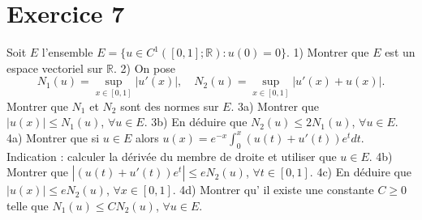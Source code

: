 \documentclass{article}
\begin{document}
\section*{Exercice 7}
Soit $E$ l'ensemble $E = \{ u \in C^1([0, 1]; \mathbb{R}) : u(0) = 0 \}$.
1) Montrer que $E$ est un espace vectoriel sur $\mathbb{R}$.
2) On pose
\[ N_1(u) = \sup_{x \in [0,1]} |u'(x)|, \quad N_2(u) = \sup_{x \in [0,1]} |u'(x) + u(x)|. \]
Montrer que $N_1$ et $N_2$ sont des normes sur $E$.
3a) Montrer que $|u(x)| \le N_1(u)$, $\forall u \in E$.
3b) En déduire que $N_2(u) \le 2 N_1(u)$, $\forall u \in E$.
4a) Montrer que si $u \in E$ alors $u(x) = e^{-x} \int_0^x (u(t) + u'(t))e^t dt$.
Indication : calculer la dérivée du membre de droite et utiliser que $u \in E$.
4b) Montrer que $|(u(t)+u'(t))e^t| \le e N_2(u)$, $\forall t \in [0, 1]$.
4c) En déduire que $|u(x)| \le e N_2(u)$, $\forall x \in [0, 1]$.
4d) Montrer qu' il existe une constante $C \ge 0$ telle que $N_1(u) \le C N_2(u)$, $\forall u \in E$.
\end{document}

